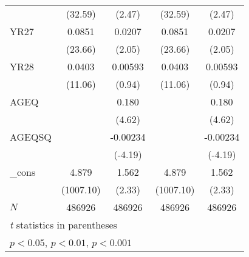 {\begin{tabular}{l*{4}{c}}
            &     (32.59)         &      (2.47)         &     (32.59)         &      (2.47)         \\
[1em]
YR27        &      0.0851\sym{***}&      0.0207\sym{*}  &      0.0851\sym{***}&      0.0207\sym{*}  \\
            &     (23.66)         &      (2.05)         &     (23.66)         &      (2.05)         \\
[1em]
YR28        &      0.0403\sym{***}&     0.00593         &      0.0403\sym{***}&     0.00593         \\
            &     (11.06)         &      (0.94)         &     (11.06)         &      (0.94)         \\
[1em]
AGEQ        &                     &       0.180\sym{***}&                     &       0.180\sym{***}\\
            &                     &      (4.62)         &                     &      (4.62)         \\
[1em]
AGEQSQ      &                     &    -0.00234\sym{***}&                     &    -0.00234\sym{***}\\
            &                     &     (-4.19)         &                     &     (-4.19)         \\
[1em]
\_cons      &       4.879\sym{***}&       1.562\sym{*}  &       4.879\sym{***}&       1.562\sym{*}  \\
            &   (1007.10)         &      (2.33)         &   (1007.10)         &      (2.33)         \\
\hline
\(N\)       &      486926         &      486926         &      486926         &      486926         \\
\hline\hline
\multicolumn{5}{l}{\footnotesize \textit{t} statistics in parentheses}\\
\multicolumn{5}{l}{\footnotesize \sym{*} \(p<0.05\), \sym{**} \(p<0.01\), \sym{***} \(p<0.001\)}\\
\end{tabular}
}
